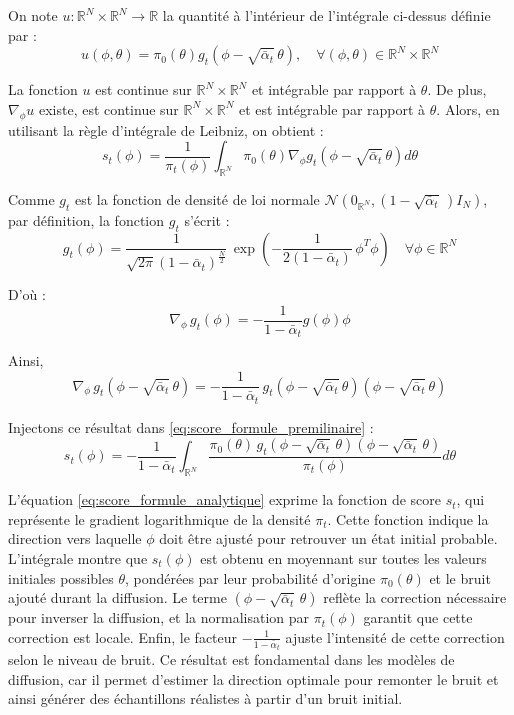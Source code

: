\documentclass[a4paper,10pt]{article}
\theoremstyle{definition} %
\theoremstyle{definition} %
\theoremstyle{definition} %
\theoremstyle{definition} %
\newcommand{\R}{\mathbb{R}}
\begin{document}
On note $u: \R^N \times \R^N \rightarrow \R$ la quantité à l'intérieur de l'intégrale ci-dessus définie par :
\[u(\phi,\theta) =  \pi_0(\theta) g_t(\phi - \sqrt{\bar \alpha_t}\,\theta), \quad \forall (\phi,\theta) \in \R^N \times \R^N\]

La fonction $u$ est continue sur $\R^N \times \R^N$ et intégrable par rapport à $\theta$. De plus, $\nabla_\phi u$ existe, est continue sur $\R^N \times \R^N$ et est intégrable par rapport à $\theta$. Alors, en utilisant la règle d'intégrale de Leibniz, on obtient :
\begin{equation}\label{eq:score_formule_premilinaire}
    s_t(\phi) = \frac{1}{\pi_t(\phi)} \int_{\R^N} \pi_0(\theta) \nabla_\phi g_t(\phi - \sqrt{\bar \alpha_t} \,\theta) d\theta 
\end{equation}

Comme $g_t$ est la fonction de densité de loi normale $\mathcal{N}\left(0_{\R^N}, (1-\sqrt{\bar \alpha _t} \,)I_N\right)$, par définition, la fonction $g_t$ s'écrit :
\begin{equation*}
    g_t(\phi) = \frac{1}{\sqrt{2\pi}(1-\bar \alpha_t)^{\frac{N}{2}}} \, \exp\left(-\frac{1}{2(1-\bar \alpha _t)}\,\phi^T\phi\right) \quad \forall \phi \in \R^N
\end{equation*}

D'où :
\begin{equation*}
    \nabla_\phi \,g_t(\phi) = -\frac{1}{1-\bar \alpha_t}g(\phi)\phi
\end{equation*}

Ainsi,
\begin{equation*}
    \nabla_\phi \,g_t(\phi - \sqrt{\bar \alpha_t} \,\theta) = -\frac{1}{1-\bar \alpha_t}\,g_t(\phi - \sqrt{\bar \alpha_t} \,\theta)(\phi - \sqrt{\bar \alpha_t} \,\theta)
\end{equation*}

Injectons ce résultat dans \cref{eq:score_formule_premilinaire} :
\begin{equation}\label{eq:score_formule_analytique}
    s_t(\phi) = -\frac{1}{1- \bar \alpha_t} \int_{\R^N} \frac{\pi_0(\theta)\, g_t(\phi - \sqrt{\bar \alpha_t} \,\theta)(\phi - \sqrt{\bar \alpha_t} \,\theta)}{\pi_t(\phi)} d\theta
\end{equation}

L'équation \eqref{eq:score_formule_analytique} exprime la fonction de score \(s_t\), qui représente le gradient logarithmique de la densité \(\pi_t\). Cette fonction indique la direction vers laquelle \(\phi\) doit être ajusté pour retrouver un état initial probable. L'intégrale montre que \(s_t(\phi)\) est obtenu en moyennant sur toutes les valeurs initiales possibles \(\theta\), pondérées par leur probabilité d'origine \(\pi_0(\theta)\) et le bruit ajouté durant la diffusion. Le terme \((\phi - \sqrt{\bar{\alpha}_t}\, \theta)\) reflète la correction nécessaire pour inverser la diffusion, et la normalisation par \(\pi_t(\phi)\) garantit que cette correction est locale. Enfin, le facteur \(-\frac{1}{1- \bar \alpha_t}\) ajuste l'intensité de cette correction selon le niveau de bruit. Ce résultat est fondamental dans les modèles de diffusion, car il permet d'estimer la direction optimale pour remonter le bruit et ainsi générer des échantillons réalistes à partir d’un bruit initial.
\end{document}
